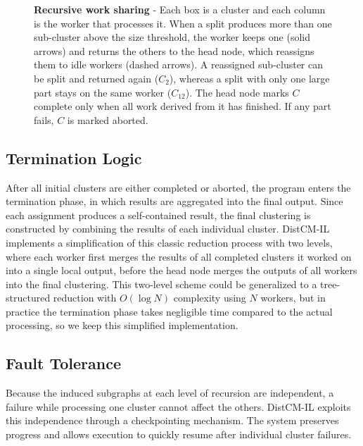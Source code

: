 \documentclass[pdflatex,lib/sn-mathphys-num]{lib/sn-jnl}%
\theoremstyle{thmstyleone}%
\theoremstyle{thmstyletwo}%
\theoremstyle{thmstylethree}%
\newcommand{\Haotian}[1]{\textcolor{teal}{(Haotian: #1)}}
\begin{document}
\begin{figure}[t]
\begin{tikzpicture}
  \end{tikzpicture}
  \vspace{4pt}%
  \caption{\textbf{Recursive work sharing} - Each box is a cluster and each column is the worker that processes it. When a split produces more than one sub-cluster above the size threshold, the worker keeps one (solid arrows) and returns the others to the head node, which reassigns them to idle workers (dashed arrows). A reassigned sub-cluster can be split and returned again ($C_2$), whereas a split with only one large part stays on the same worker ($C_{12}$). The head node marks $C$ complete only when all work derived from it has finished. If any part fails, $C$ is marked aborted.}
  \label{fig:work-redistribution}
\end{figure}

\subsection{Termination Logic}\label{appendix:ssec:termination}
After all initial clusters are either completed or aborted, the program enters the termination phase, in which results are aggregated into the final output. Since each assignment produces a self-contained result, the final clustering is constructed by combining the results of each individual cluster. DistCM-IL implements a simplification of this classic reduction process with two levels, where each worker first merges the results of all completed clusters it worked on into a single local output, before the head node merges the outputs of all workers into the final clustering. This two-level scheme could be generalized to a tree-structured reduction with $O(\log N)$ complexity using $N$ workers, but in practice the  termination phase takes negligible time compared to the actual processing, so we keep this simplified implementation.

\subsection{Fault Tolerance}\label{ssec:fault-tolerance}

Because the induced subgraphs at each level of recursion are independent, a failure while processing one cluster cannot affect the others. DistCM-IL exploits this independence through a checkpointing mechanism. The system preserves progress and allows execution to quickly resume after individual cluster failures.
\end{document}
